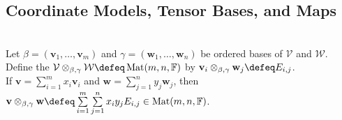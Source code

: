 \subsection{Coordinate Models, Tensor Bases, and Maps}

\begin{definition} \label{def:finite-coordinate-tensor-product-model} \\
Let $\beta=(\mathbf{v}_1,\ldots,\mathbf{v}_m)$ and $\gamma=(\mathbf{w}_1,\ldots,\mathbf{w}_n)$ be ordered bases of $\mathcal{V}$ and $\mathcal{W}$.\\
Define the  $\mathcal{V}\otimes_{\beta,\gamma}\mathcal{W}\defeq\operatorname{Mat}(m,n,\mathbb{F})$ by $\mathbf{v}_i\otimes_{\beta,\gamma}\mathbf{w}_j\defeq E_{i,j}$.\\
If $\mathbf{v}=\sum\limits_{i=1}^m x_i\mathbf{v}_i$ and $\mathbf{w}=\sum\limits_{j=1}^n y_j\mathbf{w}_j$, then $\mathbf{v}\otimes_{\beta,\gamma}\mathbf{w}\defeq \sum\limits_{i=1}^m\sum\limits_{j=1}^n x_iy_jE_{i,j}\in\operatorname{Mat}(m,n,\mathbb{F})$.
\end{definition}

